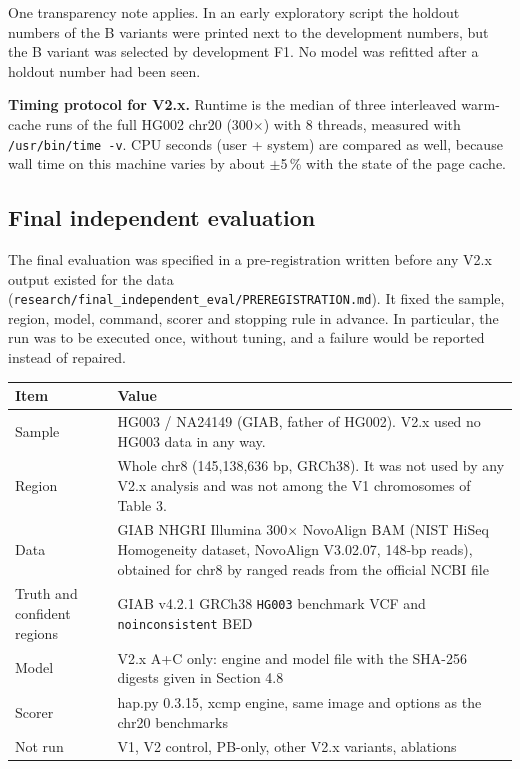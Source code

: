 \documentclass[11pt,a4paper]{article}
\makeatletter
\newcommand{\needspace}[1]{\par\ifdim\pagegoal=\maxdimen\else\dimen@=\pagegoal\advance\dimen@-\pagetotal\ifdim\dimen@<#1\relax\newpage\fi\fi}
\makeatother
\begin{document}
One transparency note applies. In an early exploratory script the holdout numbers of the B variants were printed next to the development numbers, but the B variant was selected by development F1. No model was refitted after a holdout number had been seen.

\textbf{Timing protocol for V2.x.} Runtime is the median of three interleaved warm-cache runs of the full HG002 chr20 (300$\times$) with 8 threads, measured with \texttt{/\allowbreak{}usr/\allowbreak{}bin/\allowbreak{}time -v}. CPU seconds (user + system) are compared as well, because wall time on this machine varies by about $\pm$5\,\% with the state of the page cache.

\needspace{6\baselineskip}
\subsection{\texorpdfstring{Final independent evaluation}{Final independent evaluation}}
The final evaluation was specified in a pre-registration written before any V2.x output existed for the data (\texttt{research/\allowbreak{}final\_\allowbreak{}independent\_\allowbreak{}eval/\allowbreak{}PREREGISTRATION.\allowbreak{}md}). It fixed the sample, region, model, command, scorer and stopping rule in advance. In particular, the run was to be executed once, without tuning, and a failure would be reported instead of repaired.

{\footnotesize
\setlength{\tabcolsep}{3.2pt}
\begin{xltabular}{\linewidth}{>{\hsize\raggedright\arraybackslash}X>{\hsize\raggedright\arraybackslash}X}
\toprule
\textbf{Item} & \textbf{Value} \\
\midrule
\endhead
Sample & HG003 / NA24149 (GIAB, father of HG002). V2.x used no HG003 data in any way. \\
Region & Whole chr8 (145,138,636 bp, GRCh38). It was not used by any V2.x analysis and was not among the V1 chromosomes of Table 3. \\
Data & GIAB NHGRI Illumina 300$\times$ NovoAlign BAM (NIST HiSeq Homogeneity dataset, NovoAlign V3.02.07, 148-bp reads), obtained for chr8 by ranged reads from the official NCBI file \\
Truth and confident regions & GIAB v4.2.1 GRCh38 \texttt{HG003} benchmark VCF and \texttt{noinconsistent} BED \\
Model & V2.x A+C only: engine and model file with the SHA-256 digests given in Section 4.8 \\
Scorer & hap.py 0.3.15, xcmp engine, same image and options as the chr20 benchmarks \\
Not run & V1, V2 control, PB-only, other V2.x variants, ablations \\
\bottomrule
\end{xltabular}
}
\end{document}
